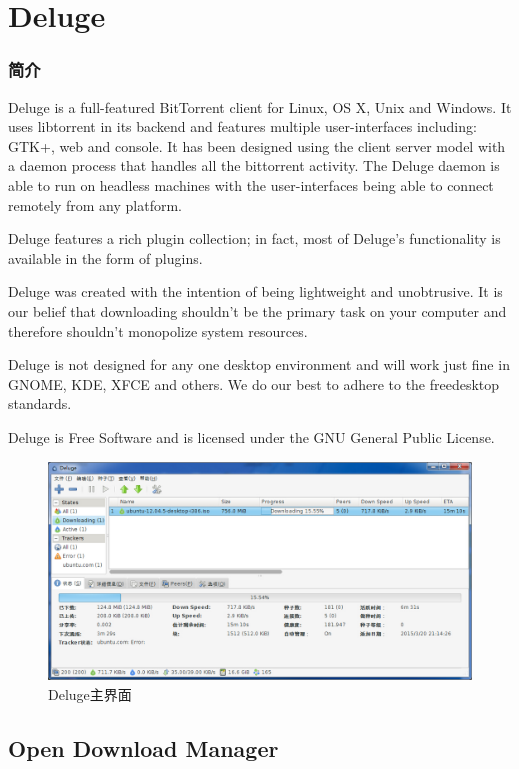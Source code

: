 \documentclass[paper=a4,fontsize=11pt]{article}
\begin{document}
	\section{Deluge}
	\subsubsection{简介}
	Deluge is a full-featured ​BitTorrent client for Linux, OS X, Unix and Windows. It uses ​libtorrent in its backend and features multiple user-interfaces including: GTK+, web and console. It has been designed using the client server model with a daemon process that handles all the bittorrent activity. The Deluge daemon is able to run on headless machines with the user-interfaces being able to connect remotely from any platform.
	
	Deluge features a rich plugin collection; in fact, most of Deluge's functionality is available in the form of plugins.
	
	Deluge was created with the intention of being lightweight and unobtrusive. It is our belief that downloading shouldn't be the primary task on your computer and therefore shouldn't monopolize system resources.
	
	Deluge is not designed for any one desktop environment and will work just fine in GNOME, KDE, XFCE and others. We do our best to adhere to the ​freedesktop standards.
	
	Deluge is ​Free Software and is licensed under the ​GNU General Public License.
	
	
	\begin{figure}[htbp]
		\centering
		\includegraphics[scale=0.35]{DelugeWindowsUI.jpg}
		\caption{Deluge主界面}
		\label{DelugeWindowsUI}
	\end{figure}
	
	\subsection{Open Download Manager}
	
\end{document}
